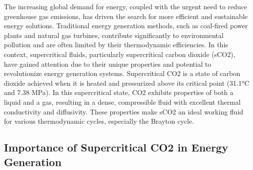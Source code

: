 
The increasing global demand for energy, coupled with the urgent need to reduce greenhouse gas emissions, has driven the search for more efficient and sustainable energy solutions. 
Traditional energy generation methods, such as coal-fired power plants and natural gas turbines, contribute significantly to environmental pollution and are often limited by their 
thermodynamic efficiencies. In this context, supercritical fluids, particularly supercritical carbon dioxide (sCO2), have gained attention due to their unique properties and 
potential to revolutionize energy generation systems.
Supercritical CO2 is a state of carbon dioxide achieved when it is heated and pressurized above its critical point (31.1°C and 7.38 MPa). 
In this supercritical state, CO2 exhibits properties of both a liquid and a gas, resulting in a dense, compressible fluid with excellent thermal conductivity and diffusivity. 
These properties make sCO2 an ideal working fluid for various thermodynamic cycles, especially the Brayton cycle.

\subsection{Importance of Supercritical CO2 in Energy Generation}